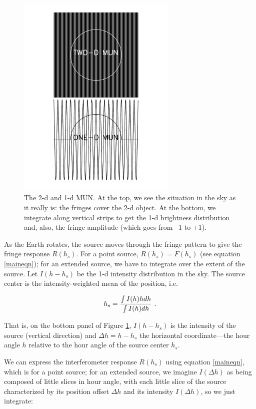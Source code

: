 \documentclass[11pt,preprint]{aastex}
\begin{document}
\begin{figure}[h!]
\begin{center}
\includegraphics[width=3.0in] {plots/interf_fig.pdf}
\end{center}
                                                                                
\caption{The 2-d and 1-d MUN. At the top, we see the situation in the
sky as it really is: the fringes cover the 2-d object.
At the bottom, we integrate along vertical strips to get the 1-d
brightness distribution and, also, the fringe amplitude (which goes from
--1 to +1). 
\label{interf_fig} } \end{figure}

As the Earth rotates, the source moves through the fringe pattern to
give the fringe response $R(h_s)$. For a point source, $R(h_s)= F(h_s)$
(see equation \ref{maineqn}); for an extended source, we have to
integrate over the extent of the source.  Let $I(h - h_s)$ be the 1-d
intensity distribution in the sky. 
The source center is the intensity-weighted mean of the
position, i.e.

\begin{equation}
h_s = { \int I(h)h dh \over \int I(h) dh} \ .
\end{equation}

\noindent That is, on the bottom panel of
Figure \ref{interf_fig}, $I(h - h_s)$ is the intensity of the source (vertical
direction) and $\Delta h= h -h_s$ the horizontal coordinate---the hour
angle $h$ relative to the hour angle of the source center $h_s$. 


We can express the interferometer response $R(h_s)$ using equation
\ref{maineqn}, which is for a point source; for an extended source, we
imagine $I(\Delta h)$ as being composed of little slices in hour angle,
with each little slice of the source characterized by its position
offset $\Delta h$ and its intensity $I(\Delta h)$, so we just integrate:
\end{document}
